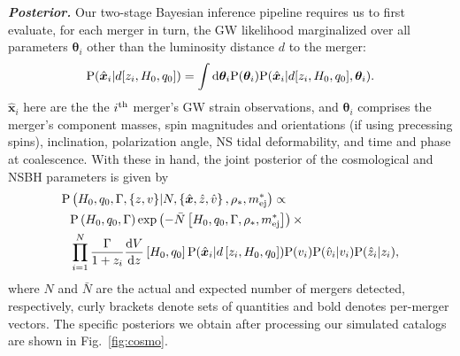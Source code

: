 \documentclass[%
 reprint,
 superscriptaddress,
 nofootinbib,
 amsmath,amssymb,
 aps,
]{revtex4-2}
\newcommand{\hubble}{\ensuremath{H_0}}
\newcommand{\decel}{\ensuremath{q_0}}
\newcommand{\prob}{\ensuremath{{\rm P}}}
\newcommand{\nexp}{\bar{N}}
\newcommand{\snrmin}{\rho_*}
\newcommand{\mejmin}{m_{\rm ej}^*}
\newcommand{\dgw}{\hat{\bm{x}}}
\begin{document}
\textbf{\emph{Posterior.}} Our two-stage Bayesian inference pipeline requires us to first evaluate, for each merger in turn, the GW likelihood marginalized over all parameters $\boldsymbol{\theta}_i$ other than the luminosity distance $d$ to the merger:
\begin{equation}
\prob(\dgw_i | d[ z_i, \hubble, \decel ]) = \int {\rm d}\boldsymbol{\theta}_i \prob(\boldsymbol{\theta}_i) \prob(\dgw_i | d[ z_i, \hubble, \decel ], \boldsymbol{\theta}_i).
\label{eq:marge_like}
\end{equation}
$\dgw_i$ here are the the $i^{\rm th}$ merger's GW strain observations, and $\boldsymbol{\theta}_i$ comprises the merger's component masses, spin magnitudes and orientations (if using precessing spins), inclination, polarization angle, NS tidal deformability, and time and phase at coalescence. With these in hand, the joint posterior of the cosmological and NSBH parameters is given by
\begin{align}
\prob & \left( \hubble, \decel, \Gamma, \{z, v\} | N, \left\{ \dgw, \hat{z}, \hat{v} \right\}, \snrmin, \mejmin \right) \propto \label{eq:posterior} \\
& \prob \left( \hubble, \decel, \Gamma \right) \exp \left( -\bar{N} \left[ \hubble, \decel, \Gamma, \snrmin, \mejmin \right] \right) \times \nonumber \\
& \prod_{i = 1}^{N} \frac{\Gamma}{1 + z_i} \frac{{\rm d}V}{{\rm d}z} \left[ \hubble, \decel \right] \prob (\dgw_i | d \left[ z_i, \hubble, \decel \right]) \prob(v_i) \prob(\hat{v}_i | v_i) \prob(\hat{z}_i | z_i), \nonumber
\end{align}
where $N$ and $\nexp$ are the actual and expected number of mergers detected, respectively, curly brackets denote sets of quantities and bold denotes per-merger vectors. The specific posteriors we obtain after processing our simulated catalogs are shown in Fig.~\ref{fig:cosmo}.


\end{document}
